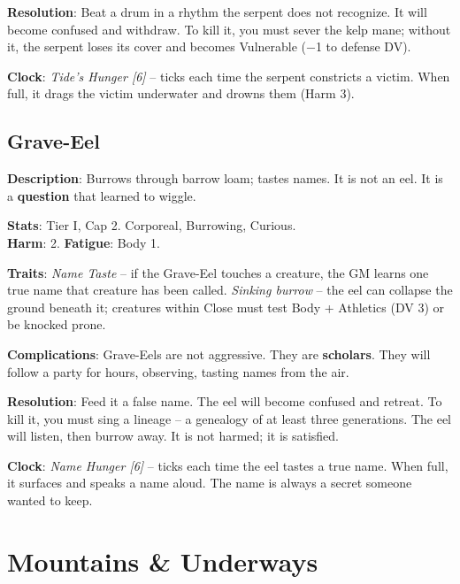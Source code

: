 \noindent\textbf{Resolution}: Beat a drum in a rhythm the serpent does not recognize. It will become confused and withdraw. To kill it, you must sever the kelp mane; without it, the serpent loses its cover and becomes Vulnerable (−1 to defense DV).

\noindent\textbf{Clock}: \emph{Tide's Hunger [6]} -- ticks each time the serpent constricts a victim. When full, it drags the victim underwater and drowns them (Harm 3).


\subsection*{Grave-Eel}

\noindent\textbf{Description}: Burrows through barrow loam; tastes names. It is not an eel. It is a \textbf{question} that learned to wiggle.

\noindent\textbf{Stats}: Tier I, Cap 2. Corporeal, Burrowing, Curious.\\
\textbf{Harm}: 2. \textbf{Fatigue}: Body 1.

\noindent\textbf{Traits}: 
\emph{Name Taste} -- if the Grave-Eel touches a creature, the GM learns one true name that creature has been called. \emph{Sinking burrow} -- the eel can collapse the ground beneath it; creatures within Close must test Body + Athletics (DV 3) or be knocked prone.

\noindent\textbf{Complications}: Grave-Eels are not aggressive. They are \textbf{scholars}. They will follow a party for hours, observing, tasting names from the air.

\noindent\textbf{Resolution}: Feed it a false name. The eel will become confused and retreat. To kill it, you must sing a lineage -- a genealogy of at least three generations. The eel will listen, then burrow away. It is not harmed; it is satisfied.

\noindent\textbf{Clock}: \emph{Name Hunger [6]} -- ticks each time the eel tastes a true name. When full, it surfaces and speaks a name aloud. The name is always a secret someone wanted to keep.


\section*{Mountains & Underways}

